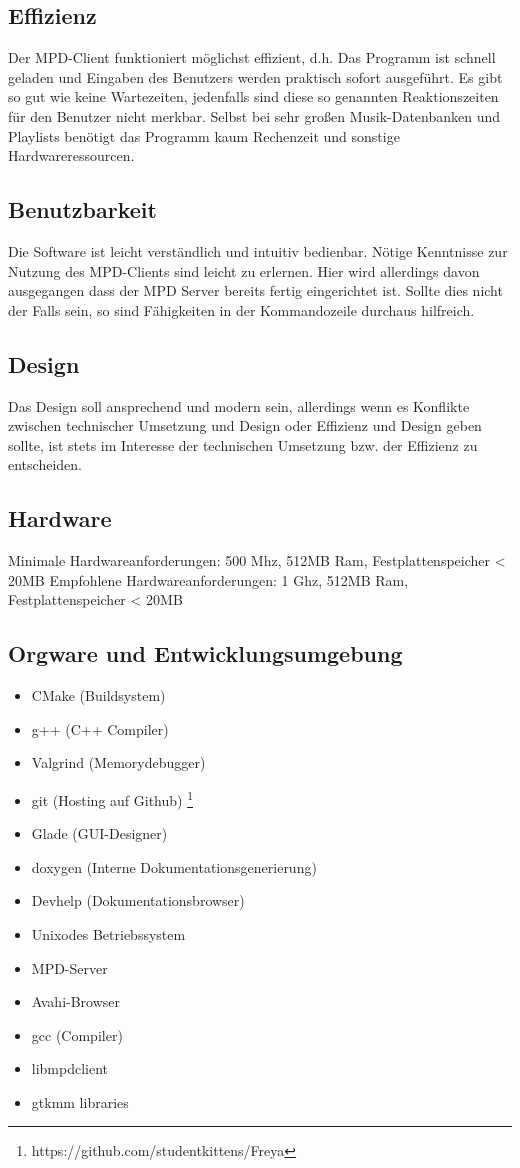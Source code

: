 \subsection{Effizienz}
Der MPD-Client funktioniert möglichst effizient, d.h. Das Programm ist schnell geladen und Eingaben des Benutzers
werden praktisch sofort ausgeführt. Es gibt so gut wie keine Wartezeiten, jedenfalls sind diese 
so genannten Reaktionszeiten für den Benutzer nicht merkbar. Selbst bei sehr großen Musik-Datenbanken
und Playlists benötigt das Programm kaum Rechenzeit und sonstige Hardwareressourcen.

\subsection{Benutzbarkeit}
Die Software ist leicht verständlich und intuitiv bedienbar. Nötige Kenntnisse zur Nutzung des 
MPD-Clients sind leicht zu erlernen. Hier wird allerdings davon ausgegangen dass der MPD Server bereits
fertig eingerichtet ist. Sollte dies nicht der Falls sein, so sind Fähigkeiten in der Kommandozeile 
durchaus hilfreich.

\subsection{Design}
Das Design soll ansprechend und modern sein, allerdings wenn es Konflikte zwischen technischer Umsetzung 
und Design oder Effizienz und Design geben sollte, ist stets im Interesse der technischen Umsetzung bzw. 
der Effizienz zu entscheiden.
\subsection{Hardware}
Minimale Hardwareanforderungen: 500 Mhz, 512MB Ram, Festplattenspeicher < 20MB
Empfohlene Hardwareanforderungen: 1 Ghz, 512MB Ram, Festplattenspeicher < 20MB

\subsection{Orgware und Entwicklungsumgebung}
\begin{itemize}
    \item CMake (Buildsystem)
    \item g++ (C++ Compiler)
    \item Valgrind (Memorydebugger)
    \item git (Hosting auf Github) \footnote{https://github.com/studentkittens/Freya}
    \item Glade (GUI-Designer)
    \item doxygen  (Interne Dokumentationsgenerierung)
    \item Devhelp (Dokumentationsbrowser)
    \item Unixodes Betriebssystem
    \item MPD-Server	
    \item Avahi-Browser
    \item gcc (Compiler)
    \item libmpdclient
    \item gtkmm libraries
\end{itemize}
\newpage
